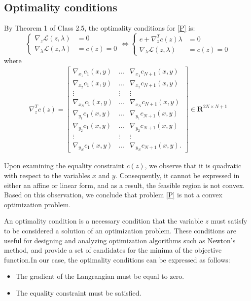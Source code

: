 \documentclass[10pt,a4paper,notitlepage,twocolumn]{article}
\begin{document}
\subsection{Optimality conditions}
By Theorem 1 of Class 2.5, the optimality conditions for \eqref{P} is:
\begin{equation}\label{OC}
\begin{cases}
      \nabla_z \mathcal{L}(z,\lambda)&= 0\\
      \nabla_\lambda \mathcal{L}(z,\lambda)&= c(z) =  0
\end{cases}       
\Longleftrightarrow
\begin{cases}
      e + \nabla_z^Tc(z)\lambda &= 0\\
      \nabla_\lambda \mathcal{L}(z,\lambda)&= c(z) =  0
\end{cases}       
\end{equation}
where
\begin{align*}
\nabla_z^T c(z) =\left[\begin{array}{ccc}
\nabla_{x_1} c_1(x, y) & \ldots & \nabla_{x_1} c_{N+1}(x, y) \\
\nabla_{x_2} c_1(x, y) & \ldots & \nabla_{x_2} c_{N+1}(x, y) \\
\vdots & \vdots & \vdots \\
\nabla_{x_N} c_1(x, y) & \ldots & \nabla_{x_N} c_{N+1}(x, y) \\
\hline \nabla_{y_1} c_1(x, y) & \ldots & \nabla_{y_1} c_{N+1}(x, y) \\
\nabla_{y_2} c_1(x, y) & \ldots & \nabla_{y_2} c_{N+1}(x, y) \\
\vdots & \vdots & \vdots \\
\nabla_{y_N} c_1(x, y) & \ldots & \nabla_{y_N} c_{N+1}(x, y).
\end{array}\right]
\in \mathbf{R}^{2 N \times N+1}
\end{align*}

Upon examining the equality constraint $c(z)$, we observe that it is quadratic with respect to the variables $x$ and $y$. Consequently, it cannot be expressed in either an affine or linear form, and as a result, the feasible region is not convex. Based on this observation, we conclude that problem \eqref{P} is not a convex optimization problem.

An optimality condition is a necessary condition that the variable $z$ must satisfy to be considered a solution of an optimization problem. These conditions are useful for designing and analyzing optimization algorithms such as Newton's method, and provide a set of candidates for the minima of the objective function.In our case, the optimality conditions can be expressed as follows:
\begin{itemize}
    \item The gradient of the Langrangian must be equal to zero.
    \item The equality constraint must be satisfied.
\end{itemize}
\end{document}

